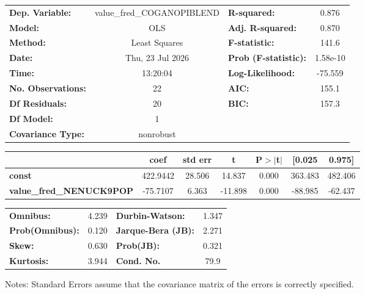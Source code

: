 \begin{center}
\begin{tabular}{lclc}
\toprule
\textbf{Dep. Variable:}          & value\_fred\_COGANOPIBLEND & \textbf{  R-squared:         } &     0.876   \\
\textbf{Model:}                  &            OLS             & \textbf{  Adj. R-squared:    } &     0.870   \\
\textbf{Method:}                 &       Least Squares        & \textbf{  F-statistic:       } &     141.6   \\
\textbf{Date:}                   &      Thu, 23 Jul 2026      & \textbf{  Prob (F-statistic):} &  1.58e-10   \\
\textbf{Time:}                   &          13:20:04          & \textbf{  Log-Likelihood:    } &   -75.559   \\
\textbf{No. Observations:}       &               22           & \textbf{  AIC:               } &     155.1   \\
\textbf{Df Residuals:}           &               20           & \textbf{  BIC:               } &     157.3   \\
\textbf{Df Model:}               &                1           & \textbf{                     } &             \\
\textbf{Covariance Type:}        &         nonrobust          & \textbf{                     } &             \\
\bottomrule
\end{tabular}
\begin{tabular}{lcccccc}
                                 & \textbf{coef} & \textbf{std err} & \textbf{t} & \textbf{P$> |$t$|$} & \textbf{[0.025} & \textbf{0.975]}  \\
\midrule
\textbf{const}                   &     422.9442  &       28.506     &    14.837  &         0.000        &      363.483    &      482.406     \\
\textbf{value\_fred\_NENUCK9POP} &     -75.7107  &        6.363     &   -11.898  &         0.000        &      -88.985    &      -62.437     \\
\bottomrule
\end{tabular}
\begin{tabular}{lclc}
\textbf{Omnibus:}       &  4.239 & \textbf{  Durbin-Watson:     } &    1.347  \\
\textbf{Prob(Omnibus):} &  0.120 & \textbf{  Jarque-Bera (JB):  } &    2.271  \\
\textbf{Skew:}          &  0.630 & \textbf{  Prob(JB):          } &    0.321  \\
\textbf{Kurtosis:}      &  3.944 & \textbf{  Cond. No.          } &     79.9  \\
\bottomrule
\end{tabular}
\end{center}

Notes: \newline
 [1] Standard Errors assume that the covariance matrix of the errors is correctly specified.
